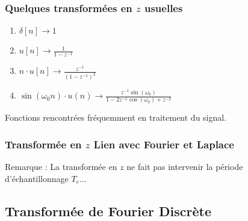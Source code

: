 \documentclass{beamer}
\begin{document}
\begin{frame}
\frametitle{Quelques transformées en $z$ usuelles}

\begin{enumerate}
\item $\delta[n] \rightarrow  1$ 
\vspace{0.3cm}
\item $u[n] \rightarrow \frac{\displaystyle 1}{ \displaystyle 1-z^{-1}}$
\vspace{0.3cm}
\item $n \cdot u[n] \rightarrow \frac{\displaystyle z^{-1}}{\displaystyle (1-z^{-1})^2} $
\vspace{0.3cm}
\item $\sin(\omega_0 n) \cdot u(n) \rightarrow  \frac{\displaystyle z^{-1} \sin(\omega_0)}{\displaystyle 1-2z^{-1} \cos(\omega_0) +z^{-2}} $
\end{enumerate} 
\vspace{0.5cm}

Fonctions rencontrées fréquemment en traitement du signal.

\end{frame}

\begin{frame}
\frametitle{Transformée en $z$ Lien avec Fourier et Laplace}

Remarque : La transformée en $z$ ne fait pas intervenir la période d'échantillonnage $T_e$...\\

\vspace{1cm}

\vspace{1cm}

\end{frame}

\subsection{Transformée de Fourier Discrète}
\end{document}
